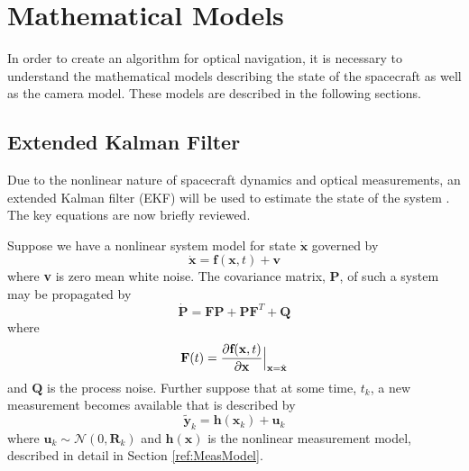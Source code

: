\documentclass[]{aiaa-tc}%
\begin{document}

\section{Mathematical Models}
In order to create an algorithm for optical navigation, it is necessary to understand the mathematical models describing the state of the spacecraft as well as the camera model.  These models are described in the following sections.


\subsection{Extended Kalman Filter}
Due to the nonlinear nature of spacecraft dynamics and optical measurements, an extended Kalman filter (EKF) will be used to estimate the state of the system \cite{Gelb,KalmanFiltering}.  The key equations are now briefly reviewed.

Suppose we have a nonlinear system model for state $\dot{\textbf{x}}$ governed by 
%
\begin{equation}
\label{eq:F}
\dot{\textbf{x}}=\textbf{f}(\textbf{x},t)+\textbf{v}
\end{equation}
%
where \textbf{v} is zero mean white noise.  The covariance matrix, $\textbf{P}$, of such a system may be propagated by 
%
\begin{equation}
\label{eq:Pdot}
\dot{\textbf{P}}=\textbf{F}\textbf{P}+\textbf{P}\textbf{F}^T+\textbf{Q}
\end{equation}
%
where 
%
\begin{equation}
\label{eq:F}
\textbf{F}(t)=\frac{\partial{\textbf{f}(\textbf{x},t)}}{\partial{\textbf{x}}}\Big{|}_{\textbf{x}=\hat{\textbf{x}}}
\end{equation}
%
and $\textbf{Q}$ is the process noise.  Further suppose that at some time, $t_{k}$, a new measurement becomes available that is described by 
%
\begin{equation}
\label{eq:ymeas}
\tilde{\textbf{y}}_k=\textbf{h}(\textbf{x}_k)+\textbf{u}_k
\end{equation}
%
where $\textbf{u}_k \sim \mathcal{N}(0,\textbf{R}_k)$ and $\textbf{h}(\textbf{x})$ is the nonlinear measurement model, described in detail in Section \ref{ref:MeasModel}.
%
%
\end{document}
